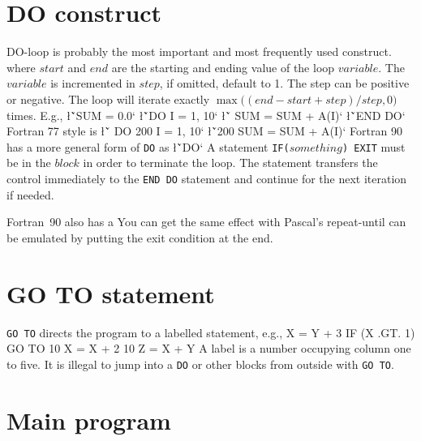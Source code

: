 {\section{DO construct}

DO-loop is probably the most important and most
frequently used construct.
\sms
{}
\sms
where $start$ and $end$ are the starting and ending value of the loop
$variable$.  The $variable$ is incremented in $step$, if omitted,
default to 1.  The step can be positive or negative.  The loop will 
iterate exactly 
$\max\bigl( (end - start + step)/step, 0\bigr)$ times.
E.g.,
\sms
\l{\v`SUM = 0.0`}
\l{\v`DO I = 1, 10`}
\l{\v`   SUM = SUM + A(I)`}
\l{\v`END DO`\m{}}
\sms
Fortran 77 style is 
\sms
\l{\v`      DO 200 I = 1, 10`}
\l{\v`200   SUM = SUM + A(I)`}
\sms
Fortran 90 has a more general form of {\tt DO} as
\sms
\l{\v`DO`}
\sms
A statement {\tt IF($something$) EXIT} must be in the $block$ in
order to terminate the loop.   The statement 
\sms
{}
\sms
transfers the control immediately to the {\tt END DO} statement and 
continue for the next iteration if needed.

Fortran~90 also has a 
\sms
{}
\sms
You can get the same effect with 
\sms
{}
\sms
Pascal's repeat-until can be emulated by putting the exit condition 
at the end.

\section{GO TO statement}
{\tt GO TO} directs the program to a labelled statement, e.g.,
\ttbg
      X = Y + 3
      IF (X .GT. 1) GO TO 10
      X = X + 2
10    Z = X + Y
\tted
A label is a number occupying column one to five.   It is illegal
to jump into a {\tt DO} or other blocks from outside with {\tt GO TO}.


\section{Main program}

}
